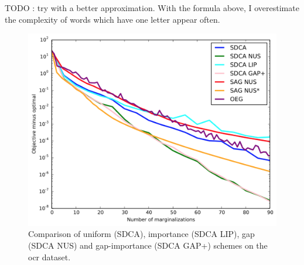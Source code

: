 \documentclass{article}
\DeclareMathOperator{\1}{\mathbb{1}}
\begin{document}
TODO : try with a better approximation. With the formula above, I overestimate the complexity of words which have one letter appear often.

\begin{figure}[ht]
	\center
	\includegraphics[width=.8\textwidth]{nus1}
	\caption{Comparison of uniform (SDCA), importance (SDCA LIP), gap (SDCA NUS) and gap-importance (SDCA GAP+) schemes on the ocr dataset.}
\end{figure}



\printbibliography
\end{document}
